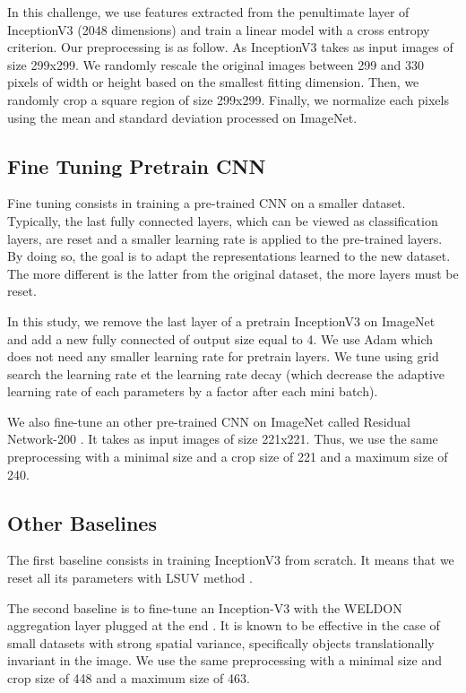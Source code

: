 \documentclass[10pt,twocolumn,letterpaper]{article}
\begin{document}
In this challenge, we use features extracted from the penultimate layer of InceptionV3 \cite{szegedy2015rethinking} (2048 dimensions) and train a linear model with a cross entropy criterion. Our preprocessing is as follow. As InceptionV3 takes as input images of size 299x299. We randomly rescale the original images between 299 and 330 pixels of width or height based on the smallest fitting dimension. Then, we randomly crop a square region of size 299x299. Finally, we normalize each pixels using the mean and standard deviation processed on ImageNet.


\subsection{Fine Tuning Pretrain CNN}

Fine tuning consists in training a pre-trained CNN on a smaller dataset. Typically, the last fully connected layers, which can be viewed as classification layers, are reset and a smaller learning rate is applied to the pre-trained layers. By doing so, the goal is to adapt the representations learned to the new dataset. The more different is the latter from the original dataset, the more layers must be reset.

In this study, we remove the last layer of a pretrain InceptionV3 on ImageNet and add a new fully connected of output size equal to 4. We use Adam \cite{Kingma14} which does not need any smaller learning rate for pretrain layers. We tune using grid search the learning rate et the learning rate decay (which decrease the adaptive learning rate of each parameters by a factor after each mini batch).

We also fine-tune an other pre-trained CNN on ImageNet called Residual Network-200 \cite{he2016deep}. It takes as input images of size 221x221. Thus, we use the same preprocessing with a minimal size and a crop size of 221 and a maximum size of 240.


\subsection{Other Baselines}

The first baseline consists in training InceptionV3 from scratch. It means that we reset all its parameters with LSUV method \cite{LSUVInit2015}.

The second baseline is to fine-tune an Inception-V3 with the WELDON aggregation layer plugged at the end \cite{durand2016weldon}.
It is known to be effective in the case of small datasets with strong spatial variance, specifically objects translationally invariant in the image.
We use the same preprocessing with a minimal size and crop size of 448 and a maximum size of 463.
\end{document}
